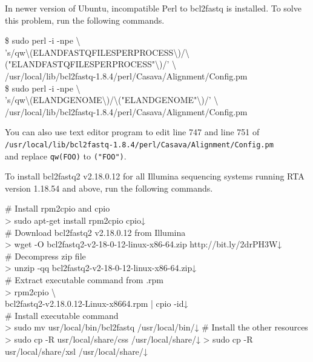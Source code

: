 \documentclass[titlepage,10pt,a4paper,english]{jsbook}
\newenvironment{cmd}{\begin{oframed}\raggedright\ttfamily\footnotesize\setlength{\baselineskip}{1.4em}}{\end{oframed}\vspace{-1em}}
\begin{document}
In newer version of Ubuntu, incompatible Perl to bcl2fastq is installed.
To solve this problem, run the following commands.
\begin{cmd}
\$ sudo perl -i -npe {\textbackslash}\\
's/qw{\textbackslash}(ELAND{\textunderscore}FASTQ{\textunderscore}FILES{\textunderscore}PER{\textunderscore}PROCESS{\textbackslash})/{\textbackslash}("ELAND{\textunderscore}FASTQ{\textunderscore}FILES{\textunderscore}PER{\textunderscore}PROCESS"{\textbackslash})/' {\textbackslash}\\
/usr/local/lib/bcl2fastq-1.8.4/perl/Casava/Alignment/Config.pm\\
\$ sudo perl -i -npe {\textbackslash}\\
's/qw{\textbackslash}(ELAND{\textunderscore}GENOME{\textbackslash})/{\textbackslash}("ELAND{\textunderscore}GENOME"{\textbackslash})/' {\textbackslash}\\
/usr/local/lib/bcl2fastq-1.8.4/perl/Casava/Alignment/Config.pm
\end{cmd}
You can also use text editor program to edit line 747 and line 751 of\\
\texttt{/usr/local/lib/bcl2fastq-1.8.4/perl/Casava/Alignment/Config.pm}\\
and replace \texttt{qw(FOO)} to \texttt{("FOO")}.

To install bcl2fastq2 v2.18.0.12 for all Illumina sequencing systems running RTA version 1.18.54 and above, run the following commands.
\begin{cmd}
\# Install rpm2cpio and cpio\\
{\textgreater} sudo apt-get install rpm2cpio cpio↓\\
\# Download bcl2fastq2 v2.18.0.12 from Illumina\\
{\textgreater} wget -O bcl2fastq2-v2-18-0-12-linux-x86-64.zip http://bit.ly/2drPH3W↓\\
\# Decompress zip file\\
{\textgreater} unzip -qq bcl2fastq2-v2-18-0-12-linux-x86-64.zip↓\\
\# Extract executable command from .rpm\\
{\textgreater} rpm2cpio {\textbackslash}\\
bcl2fastq2-v2.18.0.12-Linux-x86{\textunderscore}64.rpm | cpio -id↓\\
\# Install executable command\\
{\textgreater} sudo mv usr/local/bin/bcl2fastq /usr/local/bin/↓
\# Install the other resources\\
{\textgreater} sudo cp -R usr/local/share/css /usr/local/share/↓
{\textgreater} sudo cp -R usr/local/share/xsl /usr/local/share/↓
\end{cmd}
\end{document}
